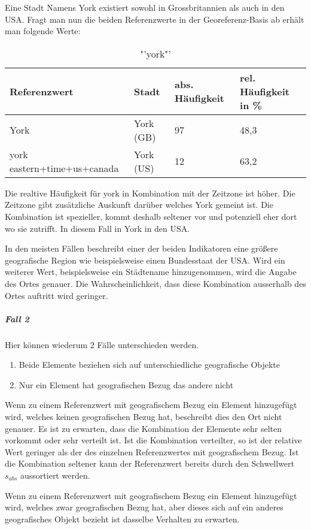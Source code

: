 						Eine Stadt Namens York existiert sowohl in Grossbritannien als auch in den USA.
						Fragt man nun die beiden Referenzwerte in der Georeferenz-Basis ab erhält man folgende Werte:

							\begin{table}[h]
								\centering
									\caption{"'york"'}
									\label{tab:york}
									\begin{tabular}{|l|l|l|l|}
									\hline
									Referenzwert 				& Stadt  	& abs. Häufigkeit & rel. Häufigkeit in \% \\ \hline \hline
									York          				& York (GB) & 97              & 48,3       \\ \hline
									york eastern+time+us+canada & York (US) & 12              & 63,2        \\ \hline
									\end{tabular}
							\end{table}

							Die realtive Häufigkeit für york in Kombination mit der Zeitzone ist höher. 
							Die Zeitzone gibt zusätzliche Auskunft darüber welches York gemeint ist. 
							Die Kombination ist spezieller, kommt deshalb seltener vor und potenziell eher dort wo sie zutrifft. 
							In diesem Fall in York in den USA. 

							In den meisten Fällen beschreibt einer der beiden Indikatoren eine größere geografische Region wie beispielsweise einen Bundesstaat der USA.
							Wird ein weiterer Wert, beispielsweise ein Städtename hinzugenommen, wird die Angabe des Ortes genauer. 
							Die Wahrscheinlichkeit, dass diese Kombination ausserhalb des Ortes auftritt wird geringer. 

					\subparagraph{Fall 2}

						Hier können wiederum 2 Fälle unterschieden werden.

						\begin{enumerate}
							\item Beide Elemente beziehen sich auf unterschiedliche geografische Objekte
							\item Nur ein Element hat geografischen Bezug das andere nicht 
						\end{enumerate}

						Wenn zu einem Referenzwert mit geografischem Bezug ein Element hinzugefügt wird, welches keinen geografischen Bezug hat, beschreibt dies den Ort nicht genauer.
						Es ist zu erwarten, dass die Kombination der Elemente sehr selten vorkommt oder sehr verteilt ist. 
						Ist die Kombination verteilter, so ist der relative Wert geringer als der des einzelnen Referenzwertes mit geografischem Bezug.
						Ist die Kombination seltener kann der Referenzwert bereits durch den Schwellwert $s_{abs}$ aussortiert werden.		

						Wenn zu einem Referenzwert mit geografischem Bezug ein Element hinzugefügt wird, welches zwar geografischen Bezug hat, aber dieses sich auf ein anderes geografisches Objekt bezieht ist dasselbe Verhalten zu erwarten.

	\newpage
	
	
			
		



	